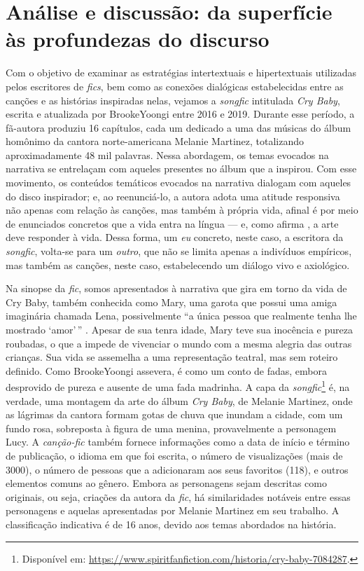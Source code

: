 \section{Análise e discussão: da superfície às profundezas do discurso}\label{sec-analise}

Com o objetivo de examinar as estratégias intertextuais e hipertextuais
utilizadas pelos escritores de \emph{fics}, bem como as conexões
dialógicas estabelecidas entre as canções e as histórias inspiradas
nelas, vejamos a \emph{songfic} intitulada \emph{Cry Baby}, escrita e
atualizada por BrookeYoongi entre 2016 e 2019. Durante esse período, a
fã-autora produziu 16 capítulos, cada um dedicado a uma das músicas do
álbum homônimo da cantora norte-americana Melanie Martinez, totalizando
aproximadamente 48 mil palavras. Nessa abordagem, os temas evocados na
narrativa se entrelaçam com aqueles presentes no álbum que a inspirou.
Com esse movimento, os conteúdos temáticos evocados na narrativa
dialogam com aqueles do disco inspirador; e, ao reenunciá-lo, a autora
adota uma atitude responsiva não apenas com relação às canções, mas
também à própria vida, afinal é por meio de enunciados concretos que a
vida entra na língua --- e, como afirma \textcite{bakhtin2011}, a arte deve
responder à vida. Dessa forma, um \emph{eu} concreto, neste caso, a
escritora da \emph{songfic}, volta-se para um \emph{outro}, que não se
limita apenas a indivíduos empíricos, mas também as canções, neste caso,
estabelecendo um diálogo vivo e axiológico.

Na sinopse da \emph{fic}, somos apresentados à narrativa que gira em
torno da vida de Cry Baby, também conhecida como Mary, uma garota que
possui uma amiga imaginária chamada Lena, possivelmente ``a única pessoa
que realmente tenha lhe mostrado `amor'\,'' \cite{brookeyoongi}.
Apesar de sua tenra idade, Mary teve sua inocência e pureza roubadas, o
que a impede de vivenciar o mundo com a mesma alegria das outras
crianças. Sua vida se assemelha a uma representação teatral, mas sem
roteiro definido. Como BrookeYoongi assevera, é como um conto de fadas,
embora desprovido de pureza e ausente de uma fada madrinha. A capa da
\emph{songfic}\footnote{Disponível em:
  \href{https://www.spiritfanfiction.com/historia/cry-baby-7084287}{https://www.spiritfanfiction.com/historia/cry-baby-7084287}.}
é, na verdade, uma montagem da arte do álbum \emph{Cry Baby}, de Melanie
Martinez, onde as lágrimas da cantora formam gotas de chuva que inundam
a cidade, com um fundo rosa, sobreposta à figura de uma menina,
provavelmente a personagem Lucy. A \emph{canção-fic} também fornece
informações como a data de início e término de publicação, o idioma em
que foi escrita, o número de visualizações (mais de 3000), o número de
pessoas que a adicionaram aos seus favoritos (118), e outros elementos
comuns ao gênero. Embora as personagens sejam descritas como originais,
ou seja, criações da autora da \emph{fic}, há similaridades notáveis
entre essas personagens e aquelas apresentadas por Melanie Martinez em
seu trabalho. A classificação indicativa é de 16 anos, devido aos temas
abordados na história.

